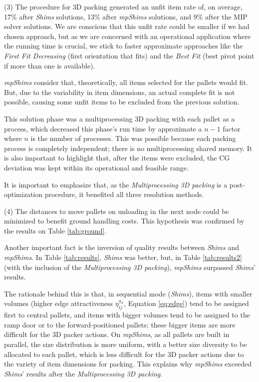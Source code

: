 \documentclass[preprint,authoryear]{elsarticle}
\begin{document}
(3) The procedure for 3D packing generated an unfit item rate of, on average, 17\% after {\it Shims} solutions, 13\% after {\it mpShims} solutions, and 9\% after the MIP solver solutions. 
We are conscious that this unfit rate could be smaller if we had chosen \cite{PaquayLimbourgSchynsOliveira2018} approach, but as we are concerned with an operational application where the running time is crucial, we stick to faster approximate approaches like the {\it First Fit Decreasing} (first orientation that fits) and the {\it Best Fit} (best pivot point if more than one is available).

{\it mpShims} consider that, theoretically, all items selected for the pallets would fit. But, due to the variability in item dimensions, an actual complete fit is not possible, causing some unfit items to be excluded from the previous solution.

This solution phase was a multiprocessing 3D packing with each pallet as a process, which decreased this phase's run time by approximate a $n-1$ factor where $n$ is the number of processes. This was possible because each packing process is completely independent; there is no multiprocessing shared memory. It is also important to highlight that, after the items were excluded, the CG deviation was kept within its operational and feasible range.

It is important to  emphasize that, as the {\it Multiprocessing 3D packing} is a post-optimization procedure, it benefited all three resolution methods.

(4) The distances to move pallets on unloading in the next node could be minimized to benefit ground handling costs.
This hypothesis was confirmed by the results on Table \ref{tab:ground}.

Another important fact is the inversion of quality results between {\it Shims} and {\it mpShims}. In Table \ref{tab:results}, {\it Shims} was better, but, in Table \ref{tab:results2} (with the inclusion of the {\it Multiprocessing 3D packing}), {\it mpShims} surpassed {\it Shims}' results.

The rationale behind this is that, in sequential mode ({\it Shims}), items with smaller volumes (higher edge attractiveness $\eta_{ij}^{\pi_k}$, Equation \ref{eq:edge}) tend to be assigned first to central pallets, and items with bigger volumes tend to be assigned to the ramp door or to the forward-positioned pallets; these bigger items are more difficult for the 3D packer actions. On {\it mpShims}, as all pallets are built in parallel, the size distribution is more uniform, with a better size diversity to be allocated to each pallet, which is less difficult for the 3D packer actions due to the variety of item dimensions for packing. This explains why {\it mpShims} exceeded {\it Shims}' results after the {\it Multiprocessing 3D packing}.
\end{document}
